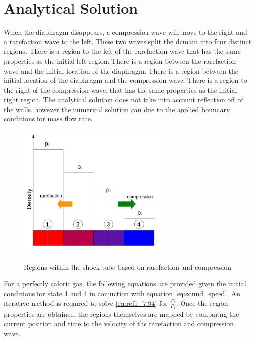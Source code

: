     \section{Analytical Solution}
    
    When the diaphragm disappears, a compression wave will move to the right and a
    rarefaction wave to the left. These two waves split the domain into four
    distinct regions. There is a region to the left of the rarefaction wave that has
    the same properties as the initial left region. There is a region between the
    rarefaction wave and the initial location of the diaphragm. There is a region
    between the initial location of the diaphragm and the compression wave. There is
    a region to the right of the compression wave, that has the same properties
    as the initial right region. The analytical solution does not take into
    account reflection off of the walls, however the numerical solution can due
    to the applied boundary conditions for mass flow rate.
    
    \begin{figure}[!h]
    	\centering
    	\includegraphics[width=0.65\textwidth]{images/Shock_Tube/Shock_Tube_regions}
    	\label{fig:V2_pressure_scaling}
    	\caption{Regions within the shock tube based on rarefaction and compression}
    \end{figure}
    
    For a perfectly caloric gas, the following equations are provided
    \cite[p. 238]{Anderson1990} given the initial conditions for state 1 and
    4 in conjuction with equation \ref{eq:sound_speed}. An iterative method is required
    to solve \ref{eq:ref1_7.94} for $\frac{P_{2}}{P_{1}}$. Once the region
    properties are obtained, the regions themselves are mapped by comparing the
    current position and time to the velocity of the rarefaction and compression
    wave. 
    
